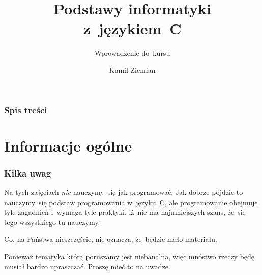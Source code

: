\documentclass[10pt,t]{beamer}
\title{Podstawy informatyki z~językiem~C}
\subtitle{Wprowadzenie do~kursu}
\author{Kamil Ziemian}
\begin{document}





\RaggedRight





\maketitle





\begin{frame}
  \frametitle{Spis treści}


  \tableofcontents

\end{frame}





\section{Informacje ogólne}








\begin{frame}
  \frametitle{Kilka uwag}


  Na tych zajęciach \textit{nie} nauczymy~się jak programować. Jak dobrze
  pójdzie to nauczymy~się podstaw programowania w~języku~C, ale
  programowanie obejmuje tyle zagadnień i~wymaga tyle praktyki, iż~nie
  ma najmniejszych szans, że~się tego wszystkiego tu nauczymy.

  Co, na Państwa nieszczęście, nie oznacza, że~będzie mało materiału.

  Ponieważ tematyka którą poruszamy jest niebanalna, więc mnóstwo rzeczy
  będę musiał bardzo upraszczać. Proszę mieć to na uwadze.

\end{frame}
\end{document}
